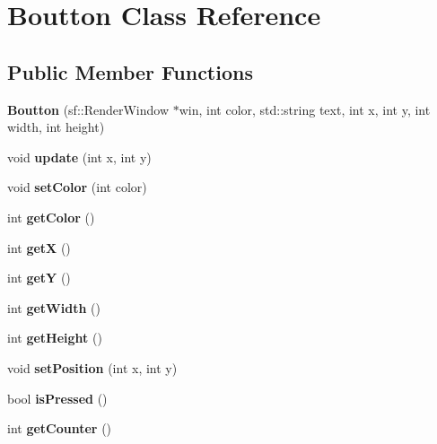 \hypertarget{classBoutton}{
\section{\-Boutton \-Class \-Reference}
\label{classBoutton}
}
\subsection*{\-Public \-Member \-Functions}
\begin{DoxyCompactItemize}
\item 
\hypertarget{classBoutton_acd4c42a2ffab3a57276d14939e0be72f}{
{\bfseries \-Boutton} (sf\-::\-Render\-Window $\ast$win, int color, std\-::string text, int x, int y, int width, int height)}
\label{classBoutton_acd4c42a2ffab3a57276d14939e0be72f}

\item 
\hypertarget{classBoutton_a59b8146c44042474b47890e792b03ff4}{
void {\bfseries update} (int x, int y)}
\label{classBoutton_a59b8146c44042474b47890e792b03ff4}

\item 
\hypertarget{classBoutton_a2d4dc7d91896ba2cc8aa04f5777c516e}{
void {\bfseries set\-Color} (int color)}
\label{classBoutton_a2d4dc7d91896ba2cc8aa04f5777c516e}

\item 
\hypertarget{classBoutton_ad5d162928ba47b0d0724f99f27ce7fee}{
int {\bfseries get\-Color} ()}
\label{classBoutton_ad5d162928ba47b0d0724f99f27ce7fee}

\item 
\hypertarget{classBoutton_abc76e95e96cbd8c9f90ac33a7a35a491}{
int {\bfseries get\-X} ()}
\label{classBoutton_abc76e95e96cbd8c9f90ac33a7a35a491}

\item 
\hypertarget{classBoutton_a55a9aec92d4b417d6f3aa560fb24c0a6}{
int {\bfseries get\-Y} ()}
\label{classBoutton_a55a9aec92d4b417d6f3aa560fb24c0a6}

\item 
\hypertarget{classBoutton_a1e5a9366d2befc6ff6b18452f08f9c33}{
int {\bfseries get\-Width} ()}
\label{classBoutton_a1e5a9366d2befc6ff6b18452f08f9c33}

\item 
\hypertarget{classBoutton_ac3bd4d87ecdb34ca500a430ea0296d01}{
int {\bfseries get\-Height} ()}
\label{classBoutton_ac3bd4d87ecdb34ca500a430ea0296d01}

\item 
\hypertarget{classBoutton_a4fd1f6cd0cb2862893c0a2d7146d8f9c}{
void {\bfseries set\-Position} (int x, int y)}
\label{classBoutton_a4fd1f6cd0cb2862893c0a2d7146d8f9c}

\item 
\hypertarget{classBoutton_a9995d601d1de2642bccb5f53fa8c70cf}{
bool {\bfseries is\-Pressed} ()}
\label{classBoutton_a9995d601d1de2642bccb5f53fa8c70cf}

\item 
\hypertarget{classBoutton_afb80ca148f5839081c5e416e5a6cedb2}{
int {\bfseries get\-Counter} ()}
\label{classBoutton_afb80ca148f5839081c5e416e5a6cedb2}

\end{DoxyCompactItemize}


